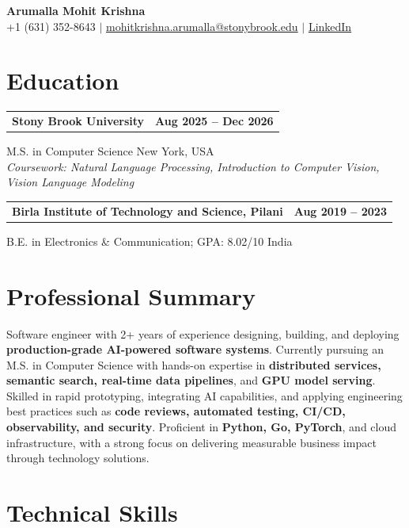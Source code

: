 \documentclass[letterpaper,10pt]{article}
\makeatletter
\newcommand{\entry}[2]{%
  \noindent
  \begin{tabularx}{\linewidth}
    {@{}>{\raggedright\arraybackslash}X@{\hspace{6pt}}r@{}}
    \textbf{#1} & #2
  \end{tabularx}\par
}
\makeatother
\begin{document}
\begin{center}
    {\LARGE\bfseries Arumalla Mohit Krishna}\\[3pt]
    +1 (631) 352-8643 $|$
    \href{mailto:mohitkrishna.arumalla@stonybrook.edu}
    {mohitkrishna.arumalla@stonybrook.edu} $|$
    \href{https://linkedin.com/in/mohit-krishna-arumalla}
    {LinkedIn}
\end{center}
\vspace{-8pt}

\section{Education}

\entry
  {\textbf{Stony Brook University}}
  {\textbf{Aug 2025 -- Dec 2026}}

M.S. in Computer Science \hfill New York, USA\\
\textit{
Coursework: Natural Language Processing,
Introduction to Computer Vision, Vision Language Modeling
}
\vspace{3pt}

\entry
  {\textbf{Birla Institute of Technology and Science, Pilani}}
  {\textbf{Aug 2019 -- 2023}}

B.E. in Electronics \& Communication; GPA: 8.02/10 \hfill India
\section{Professional Summary}

Software engineer with 2+ years of experience designing, building, and deploying \textbf{production-grade AI-powered software systems}. Currently pursuing an M.S. in Computer Science with hands-on expertise in \textbf{distributed services, semantic search, real-time data pipelines}, and \textbf{GPU model serving}. Skilled in rapid prototyping, integrating AI capabilities, and applying engineering best practices such as \textbf{code reviews, automated testing, CI/CD, observability, and security}. Proficient in \textbf{Python, Go, PyTorch}, and cloud infrastructure, with a strong focus on delivering measurable business impact through technology solutions.

\section{Technical Skills}
\end{document}

